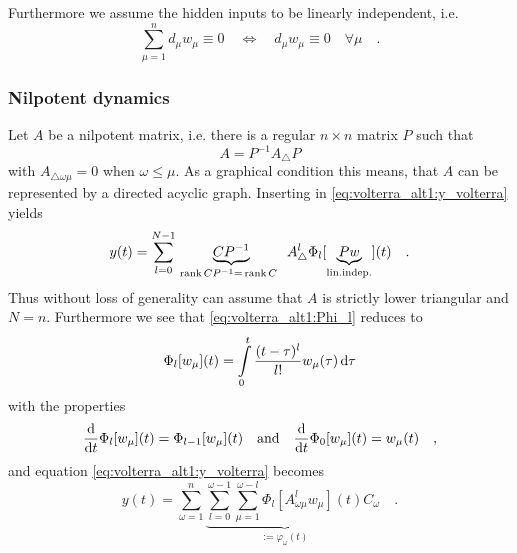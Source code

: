 Furthermore we assume the hidden inputs to be  
linearly independent, i.e.
\begin{equation}
\sum\limits_{\mu=1}^n d_\mu w_\mu \equiv 0 \quad \Leftrightarrow \quad 
d_\mu w_\mu \equiv 0 \quad \forall \mu \quad . 
\end{equation}

\subsubsection{Nilpotent dynamics}
Let $A$ be a nilpotent matrix, i.e. there is a regular $n\times n$ matrix $P$ such that
\begin{equation}
 A = P^{-1} A_\triangle P
\end{equation}
with $A_{\triangle \omega \mu} = 0$ when $\omega \leq \mu$. As a graphical condition this 
means, that $A$ can be represented by a directed acyclic graph. Inserting in  
\eqref{eq:volterra_alt1:y_volterra} yields
\begin{equation}
y(t) = \sum\limits_{l=0}^{N-1} \underbrace{CP^{-1}}_{ \, \text{rank}\,CP^{-1} 
= \, \text{rank}\,C \,\,  \,\,  } A^l_\triangle \Phi_l[\underbrace{Pw}_{ \text{lin.indep.}}](t) \quad .
\end{equation}
Thus without loss of generality can assume that $A$ is strictly lower 
triangular and $N=n$. Furthermore we see that \eqref{eq:volterra_alt1:Phi_l} reduces to
\begin{equation}
\Phi_l[w_\mu](t) = \int\limits_0^t \frac{(t-\tau)^l}{l!} w_\mu(\tau) \, \text{d}\tau
\end{equation}
with the properties
\begin{equation}
\frac{\text{d}}{\text{d} t} \Phi_l[w_\mu](t) = \Phi_{l-1}[w_\mu](t)  
\quad \text{and} \quad \frac{\text{d}}{\text{d} t} \Phi_0[w_\mu](t) = w_\mu(t)
\quad ,
\end{equation}
and equation \eqref{eq:volterra_alt1:y_volterra} becomes
\begin{equation}
y(t) = \sum\limits_{\omega=1}^{n} \underbrace{ \sum\limits_{l=0}^{\omega-1}  
\sum\limits_{\mu=1}^{\omega-l} 
 \Phi_l\left[A^l_{\omega\mu} w_\mu \right](t) }_{:=\varphi_\omega(t)} C_\omega \quad .
\end{equation}

